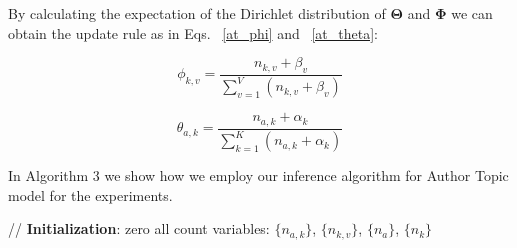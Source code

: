{By calculating the expectation of the Dirichlet distribution of $\boldsymbol{\Theta}$ and $\boldsymbol{\Phi}$ we can obtain the update rule as in Eqs. ~\ref{at_phi} and ~\ref{at_theta}:


\begin{equation}\label{at_phi}
\phi_{k,v} = \frac{n_{k,v} + \beta_{v}}{\sum_{v=1}^V(n_{k,v} + \beta_v)}
\end{equation}

\begin{equation}\label{at_theta}
\theta_{a,k} = \frac{n_{a,k} + \alpha_{k}}{\sum_{k=1}^K(n_{a,k} + \alpha_k)}
\end{equation}

In Algorithm 3 we show how we employ our inference algorithm for Author Topic model for the experiments. 


\begin{algorithm}\label{algo:AT}
\DontPrintSemicolon
\LinesNotNumbered
 

    {// \textbf{Initialization}:}\;
    zero all count variables: $\{n_{a,k}\}$, $\{n_{k,v}\}$, $\{n_{a}\}$, $\{n_{k}\}$\;
    

\end{algorithm}}
